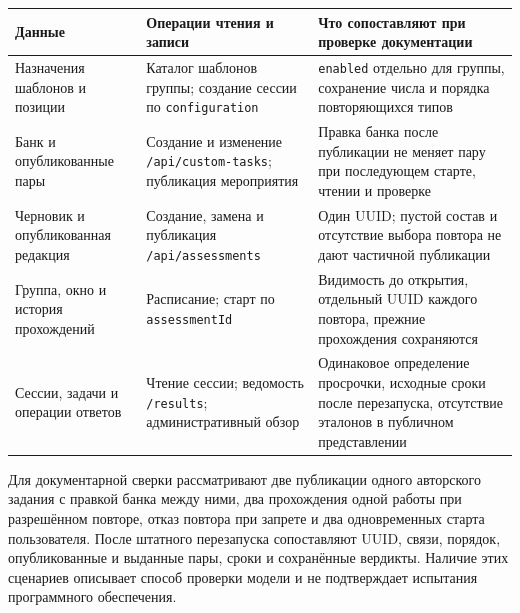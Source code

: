 \documentclass[12pt,a4paper]{article}
\newcounter{none} %
\begin{document}
{\def\LTcaptype{none} %
\begin{longtable}[]{@{}
  >{\raggedright\arraybackslash}p{}
  >{\raggedright\arraybackslash}p{}
  >{\raggedright\arraybackslash}p{}@{}}
\toprule\noalign{}
\begin{minipage}[b]{\linewidth}\raggedright
Данные
\end{minipage} & \begin{minipage}[b]{\linewidth}\raggedright
Операции чтения и записи
\end{minipage} & \begin{minipage}[b]{\linewidth}\raggedright
Что сопоставляют при проверке документации
\end{minipage} \\
\midrule\noalign{}
\endhead
\bottomrule\noalign{}
\endlastfoot
Назначения шаблонов и позиции & Каталог шаблонов группы; создание сессии по \texttt{configuration} & \texttt{enabled} отдельно для группы, сохранение числа и порядка повторяющихся типов \\
Банк и опубликованные пары & Создание и изменение \texttt{/\allowbreak{}api/\allowbreak{}custom-\allowbreak{}tasks}; публикация мероприятия & Правка банка после публикации не меняет пару при последующем старте, чтении и проверке \\
Черновик и опубликованная редакция & Создание, замена и публикация \texttt{/\allowbreak{}api/\allowbreak{}assessments} & Один UUID; пустой состав и отсутствие выбора повтора не дают частичной публикации \\
Группа, окно и история прохождений & Расписание; старт по \texttt{assessment\allowbreak{}Id} & Видимость до открытия, отдельный UUID каждого повтора, прежние прохождения сохраняются \\
Сессии, задачи и операции ответов & Чтение сессии; ведомость \texttt{/results}; административный обзор & Одинаковое определение просрочки, исходные сроки после перезапуска, отсутствие эталонов в публичном представлении \\
\end{longtable}
}

Для документарной сверки рассматривают две публикации одного авторского задания с правкой банка между ними, два прохождения одной работы при разрешённом повторе, отказ повтора при запрете и два одновременных старта пользователя. После штатного перезапуска сопоставляют UUID, связи, порядок, опубликованные и выданные пары, сроки и сохранённые вердикты. Наличие этих сценариев описывает способ проверки модели и не подтверждает испытания программного обеспечения.
\end{document}
